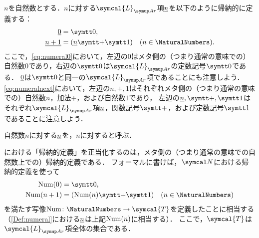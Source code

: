 \begin{Def} \label{Def:numeral}
	\(n\)を自然数とする．\(n\)に対する\(\symcal{L}_{\Ar}\)項\(\underline{n}\)を以下のように帰納的に定義する：
	\begin{align}
		\numeral{0}     & = \obj{0},
		\label{eq:numeral0}                                                                    \\
		\numeral{n + 1} & = \paren{\numeral{n} \obj{+} \obj{1}} \quad (n \in \NaturalNumbers).
		\label{eq:numeralnext}
	\end{align}
	ここで，\cref{eq:numeral0}において，左辺の\(0\)はメタ側の（つまり通常の意味での）自然数\(0\)であり，右辺の\(\obj{0}\)は\(\symcal{L}_{\Ar}\)の定数記号\(\obj{0}\)である．
	\(\underline{0}\)は\(\obj{0}\)と同一の\(\symcal{L}_{\Ar}\)項であることにも注意しよう．
	\cref{eq:numeralnext}において，左辺の\(n, \mathord{+}, 1\)はそれぞれメタ側の（つまり通常の意味での）自然数\(n\)，加法\(+\)，および自然数\(1\)であり，
	左辺の\(\numeral{n}, \obj{+}, \obj{1}\)はそれぞれ\(\symcal{L}_{\Ar}\)項\(\underline{n}\)，関数記号\(\obj{+}\)，および定数記号\(\obj{1}\)であることに注意しよう．

	自然数\(n\)に対する\(\underline{n}\)を，\(n\)に対すると呼ぶ．
\end{Def}

\begin{Note}
	における「帰納的定義」を正当化するのは，メタ側の（つまり通常の意味での自然数上での）帰納的定義である．
	フォーマルに書けば，\(\standardmodel\)における帰納的定義を使って
	\begin{align*}
		\apply{\Num}{0}      & = \obj{0},                                                              \\
		\apply{\Num}{n  + 1} & = \paren{\apply{\Num}{n} \obj{+} \obj{1}} \quad (n \in \NaturalNumbers)
	\end{align*}
	を満たす写像\(\Num \colon \NaturalNumbers \to \symcal{T}\)を定義したことに相当する（\cref{Def:numeral}における\(\underline{n}\)は上記\(\apply{\Num}{n}\)に相当する）．
	ここで，\(\symcal{T}\)は\(\symcal{L}_{\Ar}\)項全体の集合である．
\end{Note}


